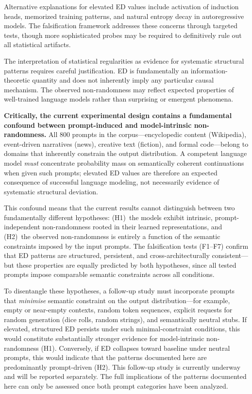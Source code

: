\documentclass[12pt]{article}
\begin{document}
Alternative explanations for elevated ED values include activation of induction heads, memorized training patterns, and natural entropy decay in autoregressive models. The falsification framework addresses these concerns through targeted tests, though more sophisticated probes may be required to definitively rule out all statistical artifacts.

The interpretation of statistical regularities as evidence for systematic structural patterns requires careful justification. ED is fundamentally an information-theoretic quantity and does not inherently imply any particular causal mechanism. The observed non-randomness may reflect expected properties of well-trained language models rather than surprising or emergent phenomena.

\textbf{Critically, the current experimental design contains a fundamental confound between prompt-induced and model-intrinsic non-randomness.} All 800 prompts in the corpus---encyclopedic content (Wikipedia), event-driven narratives (news), creative text (fiction), and formal code---belong to domains that inherently constrain the output distribution. A competent language model \emph{must} concentrate probability mass on semantically coherent continuations when given such prompts; elevated ED values are therefore an expected consequence of successful language modeling, not necessarily evidence of systematic structural deviation.

This confound means that the current results cannot distinguish between two fundamentally different hypotheses: (H1)~the models exhibit intrinsic, prompt-independent non-randomness rooted in their learned representations, and (H2)~the observed non-randomness is entirely a function of the semantic constraints imposed by the input prompts. The falsification tests (F1--F7) confirm that ED patterns are structured, persistent, and cross-architecturally consistent---but these properties are equally predicted by both hypotheses, since all tested prompts impose comparable semantic constraints across all conditions.

To disentangle these hypotheses, a follow-up study must incorporate prompts that \emph{minimise} semantic constraint on the output distribution---for example, empty or near-empty contexts, random token sequences, explicit requests for random generation (dice rolls, random strings), and semantically neutral stubs. If elevated, structured ED persists under such minimal-constraint conditions, this would constitute substantially stronger evidence for model-intrinsic non-randomness (H1). Conversely, if ED collapses toward baseline under neutral prompts, this would indicate that the patterns documented here are predominantly prompt-driven (H2). This follow-up study is currently underway and will be reported separately. The full implications of the patterns documented here can only be assessed once both prompt categories have been analyzed.
\end{document}
